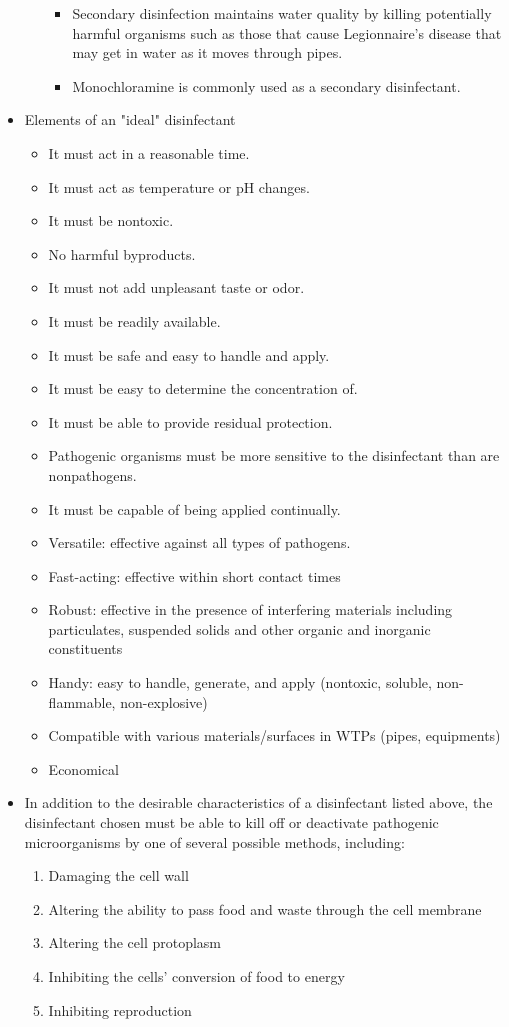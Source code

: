 \begin{itemize}
\begin{enumerate}
\begin{itemize}
\item Secondary disinfection maintains water quality by killing potentially harmful
organisms such as those that cause Legionnaire’s disease that may get in water as it moves through pipes.
\item Monochloramine is commonly used as a secondary disinfectant.
\end{itemize}
\end{enumerate}
\item Elements of an "ideal" disinfectant
\begin{itemize}
\item It must act in a reasonable time.
\item It must act as temperature or pH changes.
\item It must be nontoxic.
\item No harmful byproducts.
\item It must not add unpleasant taste or odor.
\item It must be readily available.
\item It must be safe and easy to handle and apply.
\item It must be easy to determine the concentration of.
\item It must be able to provide residual protection.
\item Pathogenic organisms must be more sensitive to the disinfectant than are nonpathogens.
\item It must be capable of being applied continually.
\item Versatile:  effective against all types of pathogens.
\item Fast-acting:  effective within short contact times
\item Robust: effective in the presence of interfering materials including particulates, suspended solids and other organic and inorganic constituents
\item Handy: easy to handle, generate, and apply (nontoxic, soluble, non-flammable, non-explosive)
\item Compatible with various materials/surfaces in WTPs (pipes, equipments)
\item Economical
\end{itemize}
\item In addition to the desirable characteristics of a disinfectant listed above, the disinfectant chosen must be able to kill off or deactivate pathogenic microorganisms by one of several possible methods, including:
\begin{enumerate}
\item Damaging the cell wall
\item Altering the ability to pass food and waste through the cell membrane
\item Altering the cell protoplasm
\item Inhibiting the cells’ conversion of food to energy
\item Inhibiting reproduction
\end{enumerate}
\end{itemize}

